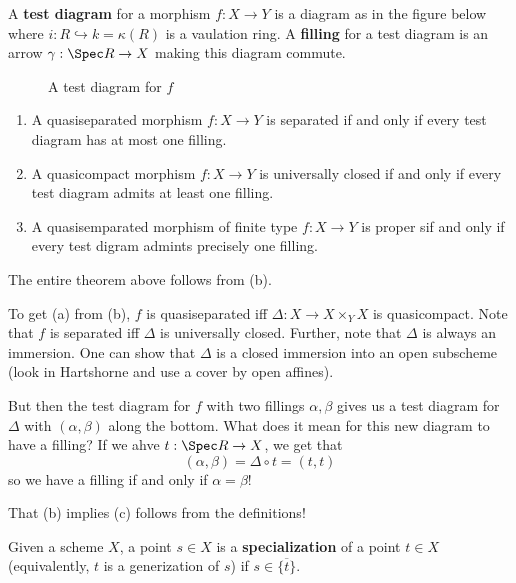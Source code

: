 \documentclass[12pt]{article}
\begin{document}
\begin{defn}
	A \textbf{test diagram} for a morphism $f:X\to Y$ is a diagram as in the figure below	
	where $i:R\hookrightarrow k=\kappa(R)$ is a vaulation ring.
	A \textbf{filling} for a test diagram is an arrow $\gamma:\Spec R\to X$ making this diagram commute.
\end{defn}
\begin{figure}[h]\label{fig:testdiagram}
	\centering
	\caption{A test diagram for $f$}
\end{figure}
\begin{thm}\label{thm:fillings}
	\begin{enumerate}
		\item A quasiseparated morphism $f:X\to Y$ is separated if and only if every test diagram has at most one filling.
		\item A quasicompact morphism $f:X\to Y$ is universally closed if and only if every test diagram admits at least one filling.
		\item A quasisemparated morphism of finite type $f:X\to Y$ is proper sif and only if every test digram admints precisely one filling.
	\end{enumerate}
\end{thm}
\begin{lem}
	The entire theorem above follows from (b).
\end{lem}
\begin{prf}
	To get (a) from (b), $f$ is quasiseparated iff $\Delta:X\to X\times_YX$ is quasicompact. Note that $f$ is separated iff $\Delta$ is 
	universally closed. Further, note that $\Delta$ is always an immersion. One can show that $\Delta$ is a closed immersion into an open subscheme (look in Hartshorne and use a cover by open affines).

	But then the test diagram for $f$ with two fillings $\alpha,\beta$ gives us a test diagram for $\Delta$ with $(\alpha,\beta)$ along the bottom.
	What does it mean for this new diagram to have a filling? If we ahve $t:\Spec R\to X$, we get that 
	\[(\alpha,\beta)=\Delta\circ t=(t,t)\]
	so we have a filling if and only if $\alpha=\beta$!

	That (b) implies (c) follows from the definitions!
\end{prf}
\begin{defn}
	Given a scheme $X$, a point $s\in X$ is a \textbf{specialization} of a point $t\in X$ (equivalently, $t$ 
	is a generization of $s$) if $s\in\overline{\{t\}}$.
\end{defn}
\end{document}
